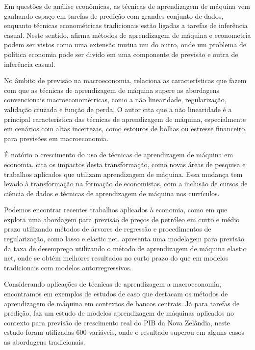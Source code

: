 Em questões de análise econômicas, as técnicas de aprendizagem de máquina vem ganhando espaço em tarefas de predição com grandes conjunto de dados, enquanto técnicas econométricas tradicionais estão ligadas a tarefas de inferência casual. Neste sentido,  afirma métodos de aprendizagem de máquina e econometria podem ser vistos como uma extensão mutua um do outro, onde um problema de política economia pode ser divido em uma componente de previsão e outra de inferência casual.

No âmbito de previsão na macroeconomia,  relaciona as características que fazem com que as técnicas de aprendizagem de máquina supere as abordagens convencionais macroeconométricas, como a não linearidade, regularização, validação cruzada e função de perda. O autor cita que a não linearidade é a principal característica das técnicas de aprendizagem de máquina, especialmente em cenários com altas incertezas, como estouros de bolhas ou estresse financeiro, para previsões em macroeconomia.


É notório o crescimento do uso de técnicas de aprendizagem de máquina em economia.  cita os impactos desta transformação, como novas áreas de pesquisa e trabalhos aplicados que utilizam aprendizagem de máquina. Essa mudança tem levado à transformação na formação de economistas, com a inclusão de cursos de ciência de dados e técnicas de aprendizagem de máquina nos currículos.

Podemos encontrar recentes trabalhos aplicados à economia, como em  que explora uma abordagem para previsão de preços de petróleo em curto e médio prazo utilizando métodos de árvores de regressão e procedimentos de regularização, como lasso e elastic net.  apresenta uma modelagem para previsão da taxa de desemprego utilizando o método de aprendizagem de máquina elastic net, onde se obtém melhores resultados no curto prazo do que em modelos tradicionais com modelos autorregressivos.

Considerando aplicações de técnicas de aprendizagem a macroeconomia, encontramos em  exemplos de estudos de caso que destacam os métodos de aprendizagem de máquina em contextos de bancos centrais. Já para tarefas de predição,  faz um estudo de modelos aprendizagem de máquinas aplicados no contexto para previsão de crescimento real do PIB da Nova Zelândia, neste estudo foram utilizadas 600 variáveis, onde o resultado superou em alguns casos as abordagens tradicionais.   

